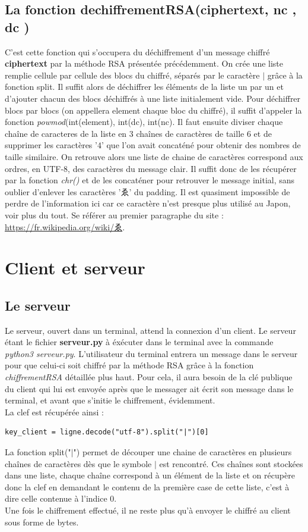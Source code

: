 \documentclass[12pt]{article}
\theoremstyle{definition}
\begin{document}
\begin{CJK}{UTF8}{min}
\subsection{La fonction dechiffrementRSA(ciphertext, nc , dc )}
	C'est cette fonction qui s'occupera du déchiffrement d'un message chiffré \textbf{ciphertext} par la méthode RSA présentée précédemment. On crée une liste remplie cellule par cellule des blocs du chiffré, séparés par le caractère $\mid$ grâce à la fonction split. Il suffit alors de déchiffrer les éléments de la liste un par un et d'ajouter chacun des blocs déchiffrés à une liste initialement vide. Pour déchiffrer blocs par blocs (on appellera element chaque bloc du chiffré), il suffit d'appeler la fonction \textit{powmod}(int(element), int(dc), int(nc). Il faut ensuite diviser chaque chaîne de caracteres de la liste en $3$ chaînes de caractères de taille $6$ et de supprimer les caractères '$4$' que l'on avait concaténé pour obtenir des nombres de taille similaire. On retrouve alors une liste de chaine de caractères correspond aux ordres, en UTF-8, des caractères du message clair. Il suffit donc de les récupérer par la fonction \textit{chr()} et de les concaténer pour retrouver le message initial, sans oublier d'enlever les caractères 'ゑ' du padding. Il est quasiment impossible de perdre de l'information ici car ce caractère n'est presque plus utilisé au Japon, voir plus du tout. Se référer au premier paragraphe du site : \url{https://fr.wikipedia.org/wiki/ゑ}.
\vfill \eject
\end{CJK}
\section{Client et serveur}


	\subsection{Le serveur}
	Le serveur, ouvert dans un terminal, attend la connexion d'un client. Le serveur étant le fichier \textbf{serveur.py} à éxécuter dans le terminal avec la commande \textit{python3 serveur.py}.
L'utilisateur du terminal entrera un message dans le serveur pour que celui-ci soit chiffré par la méthode RSA grâce à la fonction \textit{chiffrementRSA} détaillée plus haut. Pour cela, il aura besoin de la clé publique du client qui lui est envoyée après que le messager ait écrit son message dans le terminal, et avant que s'initie le chiffrement, évidemment. \\
La clef est récupérée ainsi :
\begin{verbatim}
key_client = ligne.decode("utf-8").split("|")[0]
\end{verbatim}
La fonction split("$\mid $") permet de découper une chaine de caractères en plusieurs chaînes de caractères dès que le symbole $\mid$ est rencontré. Ces chaînes sont stockées dans une liste, chaque chaîne correspond à un élément de la liste et on récupère donc la clef en demandant le contenu de la première case de cette liste, c'est à dire celle contenue à l'indice $0$.\\
Une fois le chiffrement effectué, il ne reste plus qu'à envoyer le chiffré au client sous forme de bytes. 
		
\end{document}
